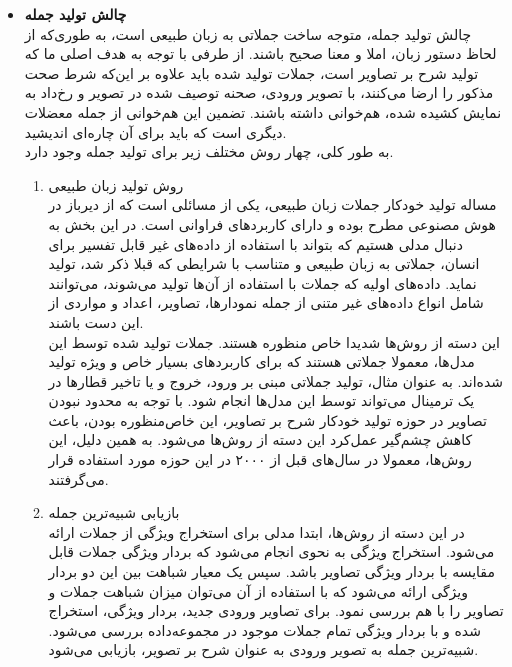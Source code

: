 \begin{itemize}
\begin{enumerate}
	
\end{enumerate}


\item \textbf{چالش تولید جمله}\\
 چالش تولید جمله، متوجه ساخت جملاتی به زبان طبیعی است، به طوری‌که از لحاظ دستور زبان، املا و معنا صحیح باشند. از طرفی با توجه به هدف اصلی ما که تولید شرح بر تصاویر است، جملات تولید شده باید علاوه بر این‌که شرط صحت مذکور را ارضا می‌کنند، با تصویر ورودی، صحنه توصیف شده در تصویر و رخ‌داد به نمایش کشیده شده، هم‌خوانی داشته باشند. تضمین این هم‌خوانی از جمله معضلات دیگری است که باید برای آن چاره‌ای اندیشید.
 \\

 به طور کلی، چهار روش مختلف زیر برای تولید جمله وجود دارد. 
 \begin{enumerate}
 	\item روش تولید زبان طبیعی \\
 	 مساله تولید خودکار جملات زبان طبیعی، یکی از مسائلی است که از دیرباز در هوش مصنوعی مطرح بوده و دارای کاربردهای فراوانی است. در این بخش به دنبال مدلی هستیم که بتواند با استفاده از داده‌های غیر قابل تفسیر برای انسان، جملاتی به زبان طبیعی و متناسب با شرایطی که قبلا ذکر شد، تولید نماید. داده‌های اولیه که جملات با استفاده از آن‌ها تولید می‌شوند، می‌توانند شامل انواع داده‌های غیر متنی از جمله نمودارها، تصاویر، اعداد و مواردی از این دست باشند.
 	 \\
 	 این دسته‌ از روش‌ها شدیدا خاص منظوره هستند. جملات تولید شده توسط این مدل‌ها، معمولا جملاتی هستند که برای کاربردهای بسیار خاص و ویژه تولید شده‌اند. به عنوان مثال، تولید جملاتی مبنی بر ورود،‌ خروج و یا تاخیر قطارها در یک ترمینال می‌تواند توسط این مدل‌ها انجام شود. با توجه به محدود نبودن تصاویر در حوزه تولید خودکار شرح بر تصاویر، این خاص‌منظوره بودن، باعث کاهش چشم‌گیر عمل‌کرد این دسته از روش‌ها می‌شود. به همین دلیل، این روش‌ها، معمولا در سال‌های قبل از ۲۰۰۰ در این حوزه مورد استفاده قرار می‌گرفتند.
	\\
 	\item  بازیابی شبیه‌ترین جمله\\
در این دسته از روش‌ها، ابتدا مدلی برای استخراج ویژگی از جملات ارائه می‌شود. استخراج ویژگی به نحوی انجام می‌شود که بردار ویژگی جملات قابل مقایسه با بردار ویژگی تصاویر باشد. سپس یک معیار شباهت بین این دو بردار ویژگی ارائه می‌شود که با استفاده از آن می‌توان میزان شباهت جملات و تصاویر را با هم بررسی نمود. برای تصاویر ورودی جدید، بردار ویژگی، استخراج شده و با بردار ویژگی تمام جملات موجود در مجموعه‌داده بررسی می‌شود. شبیه‌ترین جمله به تصویر ورودی به عنوان شرح بر تصویر، بازیابی می‌شود.
\\

\end{enumerate}
\end{itemize}

